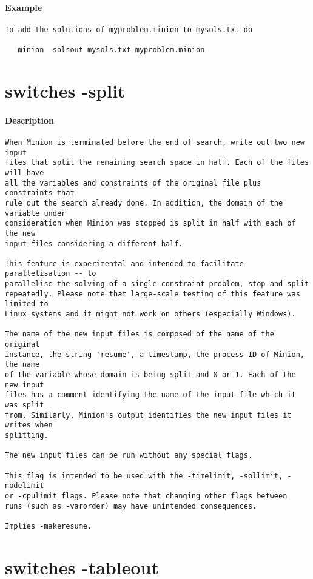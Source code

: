 \paragraph{Example}
{\footnotesize
\begin{verbatim}
To add the solutions of myproblem.minion to mysols.txt do

   minion -solsout mysols.txt myproblem.minion
\end{verbatim}
}
\section{switches -split}
\paragraph{Description}
{\footnotesize
\begin{verbatim}
When Minion is terminated before the end of search, write out two new input
files that split the remaining search space in half. Each of the files will have
all the variables and constraints of the original file plus constraints that
rule out the search already done. In addition, the domain of the variable under
consideration when Minion was stopped is split in half with each of the new
input files considering a different half.

This feature is experimental and intended to facilitate parallelisation -- to
parallelise the solving of a single constraint problem, stop and split
repeatedly. Please note that large-scale testing of this feature was limited to
Linux systems and it might not work on others (especially Windows).

The name of the new input files is composed of the name of the original
instance, the string 'resume', a timestamp, the process ID of Minion, the name
of the variable whose domain is being split and 0 or 1. Each of the new input
files has a comment identifying the name of the input file which it was split
from. Similarly, Minion's output identifies the new input files it writes when
splitting.

The new input files can be run without any special flags.

This flag is intended to be used with the -timelimit, -sollimit, -nodelimit
or -cpulimit flags. Please note that changing other flags between
runs (such as -varorder) may have unintended consequences.

Implies -makeresume.
\end{verbatim}
}
\section{switches -tableout}

